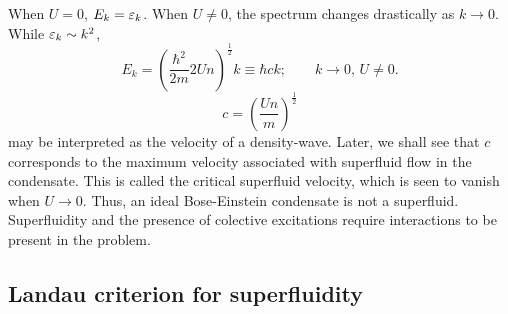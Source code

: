 When $U=0$, $E_k=\varepsilon_k$. 
When $U\ne0$, the spectrum changes drastically as $k\rightarrow0$.
While $\varepsilon_k \sim k^2$, 
\begin{equation}
	E_k = \left (\frac{\hbar^2}{2m}2Un\right )^{\frac{1}{2}}k \equiv \hbar ck; \qquad k\rightarrow 0,\, U\ne0 .
\end{equation}
\begin{equation}
	c = \left (\frac{Un}{m}\right )^{\frac{1}{2}}
\end{equation}
may be interpreted as the velocity of a density-wave. Later, we shall see that $c$ corresponds to the maximum velocity associated with superfluid flow in the condensate. This is called the critical superfluid velocity, which is seen to vanish when $U\rightarrow0$. Thus, an ideal Bose-Einstein condensate is not a superfluid. Superfluidity and the presence of colective excitations require interactions to be present in the problem. 

\subsection{Landau criterion for superfluidity}

